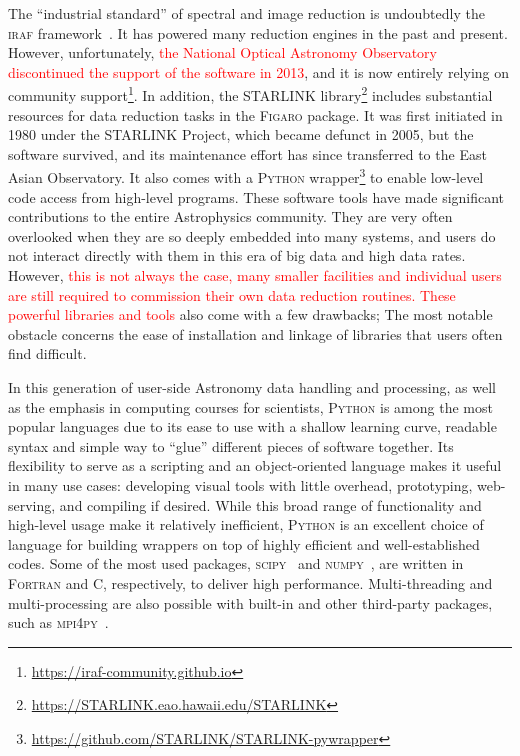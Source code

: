 \documentclass[linenumbers, twocolumn]{aastex631}
\begin{document}
The ``industrial standard'' of spectral and image reduction is undoubtedly
the \textsc{iraf} framework~\citep{1986SPIE..627..733T, 1993ASPC...52..173T}.
It has powered many reduction engines in the past and present. However,
unfortunately, \textcolor{red}{the National Optical Astronomy Observatory 
discontinued the support of the software in 2013}, and it is now
entirely relying on community support\footnote{\url{https://iraf-community.github.io}}.
In addition, the \textsc{STARLINK}
library\footnote{\url{https://STARLINK.eao.hawaii.edu/STARLINK}} \citep{2014ASPC..485..391C, 2022ASPC..532..559B}
includes substantial resources for data reduction tasks in the \textsc{Figaro} package. It was first initiated
in 1980 under the STARLINK Project, which became defunct in 2005, but the
software survived, and its maintenance effort has since transferred to the
East Asian Observatory. It also comes with a \textsc{Python}
wrapper\footnote{\url{https://github.com/STARLINK/STARLINK-pywrapper}}
to enable low-level code access from high-level programs. These software tools
have made significant contributions to the entire Astrophysics community. They
are very often overlooked when they are so deeply embedded into many systems,
and users do not interact directly with them in this era of big data
and high data rates. However, \textcolor{red}{this is not always the case,
many smaller facilities and individual users are still required to commission
their own data reduction routines. These powerful libraries and tools } also
come with a few drawbacks; The most notable obstacle concerns the ease of
installation and linkage of libraries that users often find difficult.

In this generation of user-side Astronomy data handling and processing, as
well as the emphasis in computing courses for scientists, \textsc{Python} is
among the most popular languages due to its ease to use with a shallow learning
curve, readable syntax and simple way to ``glue'' different pieces of software
together. Its flexibility to serve as a scripting and an object-oriented
language makes it useful in many use cases: developing visual tools
with little overhead, prototyping, web-serving, and compiling if
desired. While this broad range of functionality and high-level usage make it
relatively inefficient, \textsc{Python} is an excellent choice of
language for building wrappers on top of highly efficient and well-established codes.
Some of the most used packages, \textsc{scipy}~\citep{2020SciPy-NMeth}
and \textsc{numpy}~\citep{2020NumPy-Array}, are written in \textsc{Fortran}
and \textsc{C}, respectively, to deliver high performance. Multi-threading
and multi-processing are also possible with built-in and other third-party
packages, such as \textsc{mpi4py}~\citep{DALCIN20111124}. 
\end{document}
